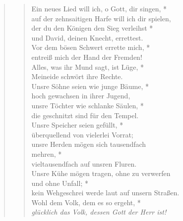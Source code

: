 \vspace{0.3cm}
\begin{quote}
 


\begin{verse}

 Ein neues Lied will ich, o Gott, dir singen, *\\
auf der zehnsaitigen Harfe will ich dir spielen,\\ \vin 
der du den Königen den Sieg verleihst *\\ \vin 
und David, deinen Knecht, errettest.\\ 
Vor dem bösen Schwert errette mich, *\\
entreiß mich der Hand der Fremden!\\ \vin 
Alles, was ihr Mund sagt, ist Lüge, *\\ \vin  Meineide schwört ihre Rechte.\\
Unsre Söhne seien wie junge Bäume, *\\
hoch gewachsen in ihrer Jugend, \\ \vin 
unsre Töchter wie schlanke Säulen, *\\ \vin  die geschnitzt sind für den Tempel.\\ 
Unsre Speicher seien gefüllt, *\\
überquellend von vielerlei Vorrat; \\ \vin 
unsre Herden mögen sich tausendfach\\ \vin mehren, *\\ \vin  vieltausendfach auf unsren Fluren.\\ 
Unsre Kühe mögen tragen, ohne zu verwerfen\\  und ohne Unfall; *\\
kein Wehgeschrei werde laut auf unsern Straßen.\\ \vin  
Wohl dem Volk, dem es so ergeht, *\\ \vin 
\textit{glücklich das Volk, dessen Gott der Herr ist!} \\
\end{verse}

\end{quote}
\vspace{0.3cm}

\def\greinitialformat#1{{\fontsize{40}{40}\selectfont #1}}
\gresetfirstlineaboveinitial{\small \textcolor{red}{Ps 145a}}{}
\setaboveinitialseparation{0.72mm}

